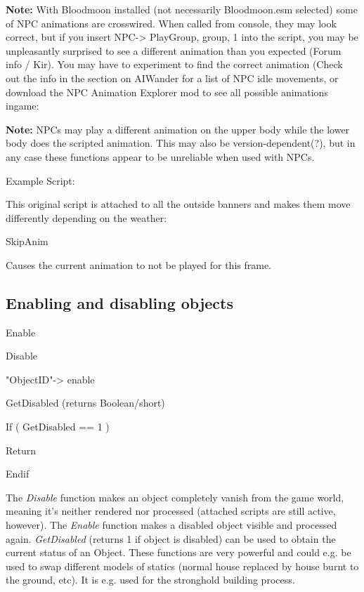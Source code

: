 \textbf{Note:} With Bloodmoon installed (not necessarily Bloodmoon.esm
selected) some of NPC animations are crosswired. When called from
console, they may look correct, but if you insert
NPC-> PlayGroup, group, 1 into the script, you may be
unpleasantly surprised to see a different animation than you expected
(Forum info / Kir). You may have to experiment to find the correct
animation (Check out the info in the section on AIWander for a list of
NPC idle movements, or download the NPC Animation Explorer mod to see
all possible animations ingame:

\textbf{Note:} NPCs may play a different animation on the upper body
while the lower body does the scripted animation. This may also be
version-dependent(?), but in any case these functions appear to be
unreliable when used with NPCs.

Example Script:

This original script is attached to all the outside banners and makes
them move differently depending on the weather:



SkipAnim

Causes the current animation to not be played for this frame.

\hypertarget{enabling-and-disabling-objects}{%
\subsection{Enabling and disabling
objects}\label{enabling-and-disabling-objects}}

Enable

Disable

"ObjectID"-> enable

GetDisabled (returns Boolean/short)

If ( GetDisabled == 1 )

Return

Endif

The \emph{Disable} function makes an object completely vanish from the
game world, meaning it's neither rendered nor processed (attached
scripts are still active, however). The \emph{Enable} function makes a
disabled object visible and processed again. \emph{GetDisabled} (returns
1 if object is disabled) can be used to obtain the current status of an
Object. These functions are very powerful and could e.g. be used to swap
different models of statics (normal house replaced by house burnt to the
ground, etc). It is e.g. used for the stronghold building process.

